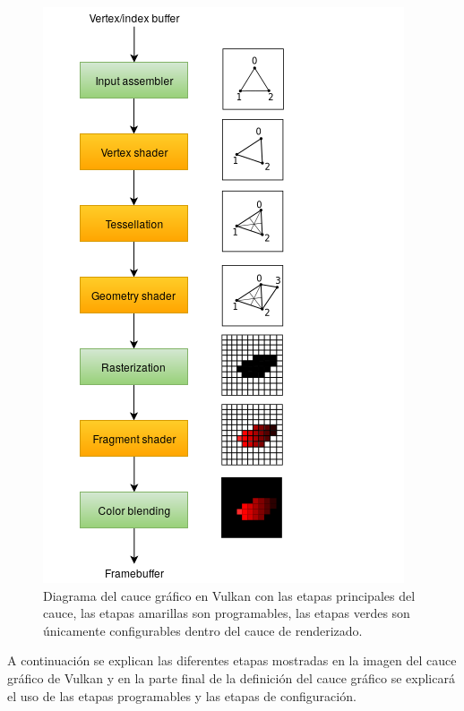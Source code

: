 \documentclass[a4paper, 17pt]{book}
\begin{document}
\begin{figure}[hbt!]
    \centering
    \includegraphics[scale=0.5, keepaspectratio]{img/vulkan_simplified_pipeline.png}
    \caption{Diagrama del cauce gráfico en Vulkan con las etapas principales del cauce,
    las etapas amarillas son programables, las etapas verdes son únicamente configurables
    dentro del cauce de renderizado.}
    \label{figura:khronos}
\end{figure}

A continuación se explican las diferentes etapas mostradas en la imagen del cauce gráfico de Vulkan
y en la parte final de la definición del cauce gráfico se explicará el uso de las etapas programables
y las etapas de configuración.
\end{document}
